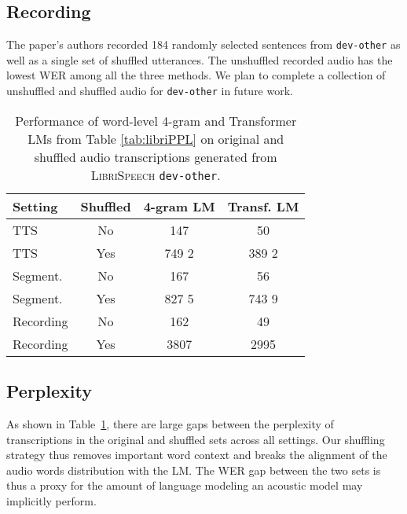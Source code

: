 \documentclass{article}
\def\devother{\texttt{dev-other}}
\newcommand{\librispeech}{\textsc{LibriSpeech}}
\begin{document}
\subsection{Recording}
The paper's authors recorded 184 randomly selected sentences from \devother{} as well as a single set of shuffled utterances. The unshuffled recorded audio has the lowest WER among all the three methods. We plan to complete a collection of unshuffled and shuffled audio for \devother{} in future work.

\begin{table}[h!]
\caption{Performance of word-level 4-gram and Transformer LMs from Table \ref{tab:libriPPL} on original and shuffled audio transcriptions generated from \librispeech{} \devother{}.}
\label{tab:shuffledsentencesappendix}
\vskip 0.1in
\begin{center}
\begin{small}
\begin{sc}
\begin{tabular}{lccc}
    \toprule
    Setting & Shuffled & 4-gram LM & Transf. LM \\
    \midrule
    TTS & No & 147 & 50 \\
    TTS & Yes & 749  2 & 389  2 \\
    \midrule
    Segment. & No & 167 & 56 \\
    Segment. & Yes & 827  5 & 743  9 \\
    \midrule
    Recording & No & 162 & 49 \\
    Recording & Yes & 3807 & 2995 \\
    \bottomrule
    \end{tabular}\end{sc}
\end{small}
\end{center}
\vskip -0.1in
\end{table}


\subsection{Perplexity}
As shown in Table~\ref{tab:shuffledsentencesappendix}, there are large gaps between the perplexity of transcriptions in the original and shuffled sets across all settings. Our shuffling strategy thus removes important word context and breaks the alignment of the audio words distribution with the LM. The WER gap between the two sets is thus a proxy for the amount of language modeling an acoustic model may implicitly perform.
 
\end{document}
